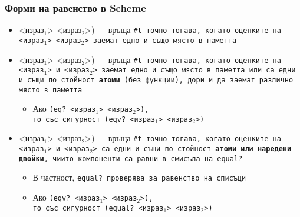 \documentclass[alsotrans]{beamerswitch}
\begin{document}
\begin{frame}
  \frametitle{Форми на равенство в Scheme}

  \begin{itemize}[<+->]
  \item {} <израз$_1$> <израз$_2$>\tta) --- връща \tt{\#t} точно тогава, когато оценките на <израз$_1$> <израз$_2$> заемат едно и също място в паметта
  \item {} <израз$_1$> <израз$_2$>\tta) --- връща \tt{\#t} точно тогава, когато оценките на <израз$_1$> и <израз$_2$> заемат едно и също място в паметта или са едни и същи по стойност \textbf{атоми} (без функции), дори и да заемат различно място в паметта
    \begin{itemize}
    \item Ако \tt{(eq?} <израз$_1$> <израз$_2$>\tt),\\
      то със сигурност \tt{(eqv?} <израз$_1$> <израз$_2$>\tt)
    \end{itemize}
  \item {} <израз$_1$> <израз$_2$>\tta) --- връща \tt{\#t} точно тогава, когато оценките на <израз$_1$> и <израз$_2$> са едни и същи по стойност \textbf{атоми или наредени двойки}, чиито компоненти са равни в смисъла на \tt{equal?}
    \begin{itemize}
    \item В частност, \tt{equal?} проверява за равенство на списъци
    \item Ако \tt{(eqv?} <израз$_1$> <израз$_2$>\tt),\\
      то със сигурност \tt{(equal?} <израз$_1$> <израз$_2$>\tt)
    \end{itemize}
  \end{itemize}
\end{frame}
\end{document}
